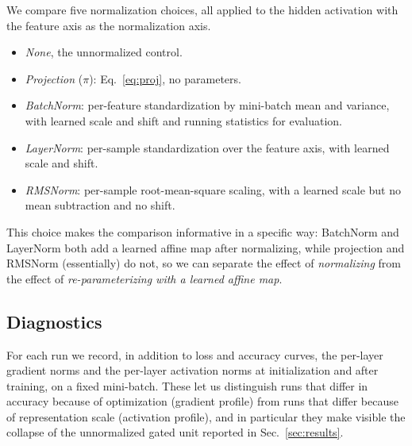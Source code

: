 We compare five normalization choices, all applied to the hidden activation
with the feature axis as the normalization axis.
\begin{itemize}
\item \emph{None}, the unnormalized control.
\item \emph{Projection} ($\pi$): Eq.~\eqref{eq:proj}, no parameters.
\item \emph{BatchNorm}: per-feature standardization by mini-batch mean and
  variance, with learned scale and shift and running statistics for
  evaluation.
\item \emph{LayerNorm}: per-sample standardization over the feature axis, with
  learned scale and shift.
\item \emph{RMSNorm}: per-sample root-mean-square scaling, with a learned
  scale but no mean subtraction and no shift.
\end{itemize}
This choice makes the comparison informative in a specific way: BatchNorm and
LayerNorm both add a learned affine map after normalizing, while projection
and RMSNorm (essentially) do not, so we can separate the effect of
\emph{normalizing} from the effect of \emph{re-parameterizing with a learned
affine map}.

\subsection{Diagnostics}

For each run we record, in addition to loss and accuracy curves, the
per-layer gradient norms and the per-layer activation norms at
initialization and after training, on a fixed mini-batch. These let us
distinguish runs that differ in accuracy because of optimization (gradient
profile) from runs that differ because of representation scale (activation
profile), and in particular they make visible the collapse of the
unnormalized gated unit reported in Sec.~\ref{sec:results}.
